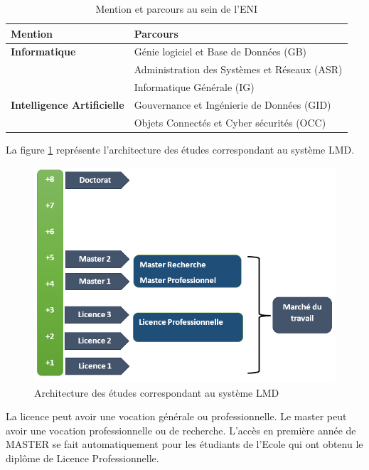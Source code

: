 \documentclass[12pt]{report}
\begin{document}
				\begin{table}[h]
				  \centering
				  \caption{Mention et parcours au sein de l’ENI}
				  \label{tab:mentionsEtParcoursENI}
					  \begin{tabular}{|p{7cm}|p{7cm}|}
						\hline 
						\textbf{Mention} & \textbf{Parcours} \\
						\hline 
						\textbf{Informatique} & Génie logiciel et Base de Données (GB) \\ \cline{2-2} & Administration des Systèmes et Réseaux (ASR) \\ \cline{2-2} & Informatique Générale (IG) \\ 
						\hline 
						\textbf{Intelligence Artificielle} & Gouvernance et Ingénierie de Données (GID) \\ \cline{2-2} & Objets Connectés et Cyber sécurités (OCC) \\
						\hline 
					  \end{tabular}
				\end{table}
				\FloatBarrier

				La figure \ref{fig:LMD} représente l’architecture des études correspondant au système LMD.

				\begin{figure}[h]
					\centering
					\includegraphics[width=\textwidth]{image5.png}
					\caption{Architecture des études correspondant au système LMD}
					\label{fig:LMD}
				\end{figure}
				\FloatBarrier
				
				La licence peut avoir une vocation générale ou professionnelle. Le master peut avoir une vocation professionnelle ou de recherche. L’accès en première année de MASTER se fait automatiquement pour les étudiants de l’Ecole qui ont obtenu le diplôme de Licence Professionnelle.				
\end{document}
